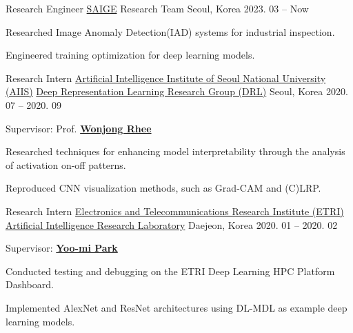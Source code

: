 \documentclass[11pt, a4paper]{cv}
\begin{document}
\begin{cventries}

  \cvexperience
    {Research Engineer} %
    {\href{https://saige.ai/en/}{SAIGE}} %
    {Research Team} %
    {Seoul, Korea} %
    {2023. 03 -- Now} %
    {
      \begin{cvitems} %
        \item {Researched Image Anomaly Detection(IAD) systems for industrial inspection.}
        \item {Engineered training optimization for deep learning models.}
      \end{cvitems}
    }

  \cvexperience
    {Research Intern} %
    {\href{https://aiis.snu.ac.kr/eng/}{Artificial Intelligence Institute of Seoul National University (AIIS)}} %
    {\href{http://drl.snu.ac.kr}{Deep Representation Learning Research Group (DRL)}} %
    {Seoul, Korea} %
    {2020. 07 -- 2020. 09} %
    {
      \begin{cvitems} %
        \item {Supervisor: Prof. \href{http://drl.snu.ac.kr/?p=13209}{\bfseries\color{graytext} Wonjong Rhee}}
        \item {Researched techniques for enhancing model interpretability through the analysis of activation on-off patterns.}
        \item {Reproduced CNN visualization methods, such as Grad-CAM and (C)LRP.}
      \end{cvitems}
    }

  \cvexperience
    {Research Intern} %
    {\href{https://etri.re.kr/eng/main/main.etri}{Electronics and Telecommunications Research Institute (ETRI)}} %
    {\href{https://etri.re.kr/eng/sub6/sub6_0101.etri?departCode=10}{Artificial Intelligence Research Laboratory}} %
    {Daejeon, Korea} %
    {2020. 01 -- 2020. 02} %
    {
      \begin{cvitems} %
        \item {Supervisor: \href{https://kr.linkedin.com/in/yoomipark-etri}{\bfseries\color{graytext} Yoo-mi Park}}
        \item {Conducted testing and debugging on the ETRI Deep Learning HPC Platform Dashboard.}
        \item {Implemented AlexNet and ResNet architectures using DL-MDL as example deep learning models.}
      \end{cvitems}
    }

\end{cventries}
\end{document}
